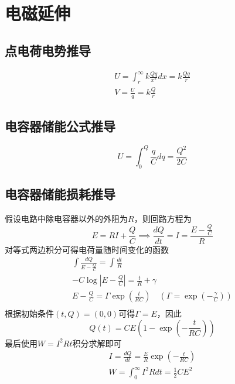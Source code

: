 \section{电磁延伸}

\subsection{点电荷电势推导}

\begin{gather*}
    U=\int_r^\infty k\frac{Qq}{x^2}dx=k\frac{Qq}{r}\\
    V=\frac{U}{q}=k\frac{Q}{r}
\end{gather*}

\subsection{电容器储能公式推导}

\begin{equation*}
    U=\int_0^Q\frac{q}{C}dq=\frac{Q^2}{2C}
\end{equation*}

\subsection{电容器储能损耗推导}

假设电路中除电容器以外的外阻为$R$，则回路方程为
\begin{equation*}
    E=RI+\frac{Q}{C}\implies
    \frac{dQ}{dt}=I=\frac{E-\frac{Q}{C}}{R}
\end{equation*}
对等式两边积分可得电荷量随时间变化的函数
\begin{gather*}
    \int\frac{dQ}{E-\frac{Q}{C}}=\int\frac{dt}{R}\\
    -C\log\left\lvert E-\frac{Q}{C}\right\rvert=\frac{t}{R}+\gamma\\
    E-\frac{Q}{C}=\Gamma\exp\left(\frac{t}{RC}\right)\quad\left(\Gamma=\exp\left(-\frac{\gamma}{C}\right)\right)\\
\end{gather*}
根据初始条件$(t,Q)=(0,0)$可得$\Gamma=E$，因此
\begin{equation*}
    Q(t)=CE\left(1-\exp\left(-\frac{t}{RC}\right)\right)
\end{equation*}
最后使用$W=I^2Rt$积分求解即可
\begin{gather*}
    I=\frac{dQ}{dt}=\frac{E}{R}\exp\left(-\frac{t}{RC}\right)\\
    W=\int_0^\infty I^2Rdt=\frac12CE^2
\end{gather*}


